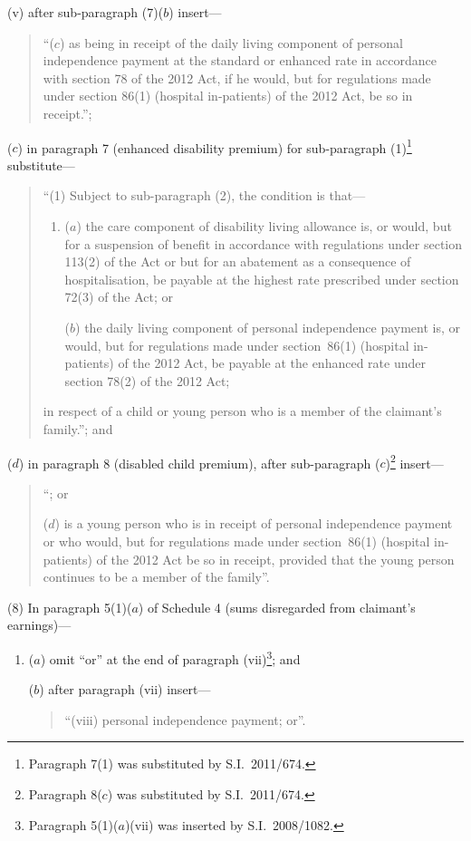 \documentclass[12pt,a4paper]{article}
\begin{document}
\begin{enumerate}
\begin{enumerate}
(v) after sub-paragraph (7)($b$)  insert—
\begin{quotation}
“($c$) as being in receipt of the daily living component of personal independence payment at the standard or enhanced rate in accordance with section 78 of the 2012 Act, if he would, but for regulations made under section 86(1) (hospital in-patients) of the 2012 Act, be so in receipt.”;
\end{quotation}
\end{enumerate}

($c$) in paragraph 7 (enhanced disability premium) for sub-paragraph (1)\footnote{Paragraph 7(1) was substituted by S.I.~2011/674.} substitute—
\begin{quotation}
“(1) Subject to sub-paragraph (2), the condition is that—
\begin{enumerate}\item[]
($a$) the care component of disability living allowance is, or would, but for a suspension of benefit in accordance with regulations under section 113(2) of the Act or but for an abatement as a consequence of hospitalisation, be payable at the highest rate prescribed under section 72(3) of the Act; or

($b$) the daily living component of personal independence payment is, or would, but for regulations made under section~86(1) (hospital in-patients) of the 2012 Act, be payable at the enhanced rate under section 78(2) of the 2012 Act;
\end{enumerate}
in respect of a child or young person who is a member of the claimant’s family.”; and
\end{quotation}

($d$) in paragraph 8 (disabled child premium), after sub-paragraph ($c$)\footnote{Paragraph 8($c$)  was substituted by S.I.~2011/674.} insert—
\begin{quotation}
“; or

($d$) is a young person who is in receipt of personal independence payment or who would, but for regulations made under section~86(1) (hospital in-patients) of the 2012 Act be so in receipt, provided that the young person continues to be a member of the family”.
\end{quotation}
\end{enumerate}

(8) In paragraph 5(1)($a$)  of Schedule 4 (sums disregarded from claimant’s earnings)—
\begin{enumerate}\item[]
($a$) omit “or” at the end of paragraph (vii)\footnote{Paragraph 5(1)($a$)(vii)  was inserted by S.I.~2008/1082.}; and

($b$) after paragraph (vii)  insert—
\begin{quotation}
“(viii) personal independence payment; or”.
\end{quotation}
\end{enumerate}
\end{document}
